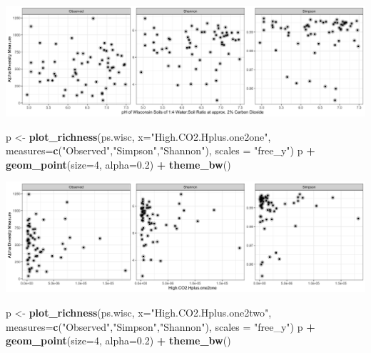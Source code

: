 \documentclass[]{article}
\newenvironment{Shaded}{\begin{snugshade}}{\end{snugshade}}
\newcommand{\DataTypeTok}[1]{\textcolor[rgb]{0.13,0.29,0.53}{#1}}
\newcommand{\DecValTok}[1]{\textcolor[rgb]{0.00,0.00,0.81}{#1}}
\newcommand{\FloatTok}[1]{\textcolor[rgb]{0.00,0.00,0.81}{#1}}
\newcommand{\KeywordTok}[1]{\textcolor[rgb]{0.13,0.29,0.53}{\textbf{#1}}}
\newcommand{\NormalTok}[1]{#1}
\newcommand{\OperatorTok}[1]{\textcolor[rgb]{0.81,0.36,0.00}{\textbf{#1}}}
\newcommand{\StringTok}[1]{\textcolor[rgb]{0.31,0.60,0.02}{#1}}
\begin{document}
\includegraphics{output-rmd/richness-ph-High.CO2.pH.one2four.wisc-1.png}

\begin{Shaded}
\begin{Highlighting}[]
\NormalTok{p <-}\StringTok{ }\KeywordTok{plot_richness}\NormalTok{(ps.wisc, }\DataTypeTok{x=}\StringTok{"High.CO2.Hplus.one2one"}\NormalTok{, }\DataTypeTok{measures=}\KeywordTok{c}\NormalTok{(}\StringTok{"Observed"}\NormalTok{,}\StringTok{"Simpson"}\NormalTok{,}\StringTok{"Shannon"}\NormalTok{), }\DataTypeTok{scales =} \StringTok{"free_y"}\NormalTok{)}
\NormalTok{p }\OperatorTok{+}\StringTok{ }\KeywordTok{geom_point}\NormalTok{(}\DataTypeTok{size=}\DecValTok{4}\NormalTok{, }\DataTypeTok{alpha=}\FloatTok{0.2}\NormalTok{) }\OperatorTok{+}\StringTok{ }\KeywordTok{theme_bw}\NormalTok{()}
\end{Highlighting}
\end{Shaded}

\includegraphics{output-rmd/richness-ph-High.CO2.Hplus.one2one.wisc-1.png}

\begin{Shaded}
\begin{Highlighting}[]
\NormalTok{p <-}\StringTok{ }\KeywordTok{plot_richness}\NormalTok{(ps.wisc, }\DataTypeTok{x=}\StringTok{"High.CO2.Hplus.one2two"}\NormalTok{, }\DataTypeTok{measures=}\KeywordTok{c}\NormalTok{(}\StringTok{"Observed"}\NormalTok{,}\StringTok{"Simpson"}\NormalTok{,}\StringTok{"Shannon"}\NormalTok{), }\DataTypeTok{scales =} \StringTok{"free_y"}\NormalTok{)}
\NormalTok{p }\OperatorTok{+}\StringTok{ }\KeywordTok{geom_point}\NormalTok{(}\DataTypeTok{size=}\DecValTok{4}\NormalTok{, }\DataTypeTok{alpha=}\FloatTok{0.2}\NormalTok{) }\OperatorTok{+}\StringTok{ }\KeywordTok{theme_bw}\NormalTok{()}
\end{Highlighting}
\end{Shaded}
\end{document}
